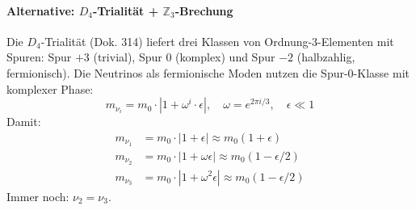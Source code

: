 \documentclass[11pt,a4paper]{article}
\begin{document}
	\paragraph{Alternative: $D_4$-Trialität + $\mathbb{Z}_3$-Brechung}
	Die $D_4$-Trialität (Dok. 314) liefert drei Klassen von Ordnung-3-Elementen mit Spuren: Spur $+3$ (trivial), Spur $0$ (komplex) und Spur $-2$ (halbzahlig, fermionisch).
	Die Neutrinos als fermionische Moden nutzen die Spur-0-Klasse mit komplexer Phase:
	\begin{equation}
		m_{\nu_i} = m_0 \cdot |1 + \omega^i \cdot \epsilon|, \quad \omega = e^{2\pi i/3}, \quad \epsilon \ll 1
	\end{equation}
	Damit:
	\begin{align}
		m_{\nu_1} &= m_0 \cdot |1 + \epsilon| \approx m_0(1 + \epsilon) \\
		m_{\nu_2} &= m_0 \cdot |1 + \omega \epsilon| \approx m_0(1 - \epsilon/2) \\
		m_{\nu_3} &= m_0 \cdot |1 + \omega^2 \epsilon| \approx m_0(1 - \epsilon/2)
	\end{align}
	Immer noch: $\nu_2 = \nu_3$.
	
\end{document}
